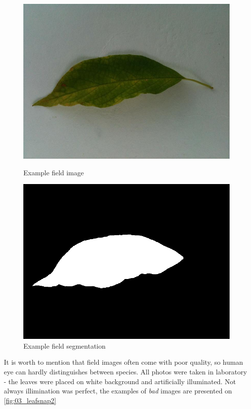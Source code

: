 \documentclass[../Main.tex]{subfiles}
\begin{document}
    \begin{figure}[H]
            \includegraphics[width=\linewidth]{Images/datasets/03_leafsnap1_3.jpg}
            \caption{Example field image}
            \label{fig:03_leafsnap1}
        \endminipage\hfill
            \includegraphics[width=\linewidth]{Images/datasets/03_leafsnap1_4.png}
            \caption{Example field segmentation}
            \label{fig:03_leafsnap1_2}
        \endminipage\hfill
    \end{figure}
    
    It is worth to mention that field images often come with poor quality, so human eye can hardly distinguishes between species. All photos were taken in laboratory - the leaves were placed on white background and artificially illuminated. Not always illimination was perfect, the examples of \textit{bad} images are presented on \ref{fig:03_leafsnap2}
    
\end{document}

